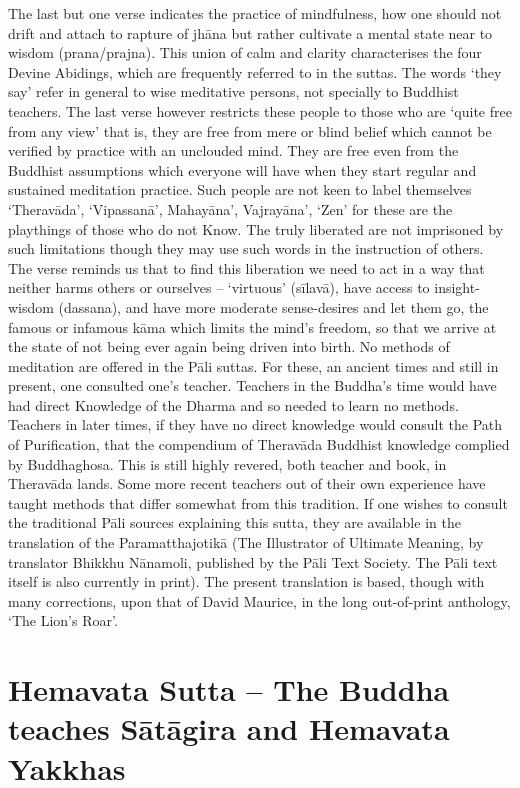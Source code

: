    The last but one verse indicates the practice of mindfulness, how one should not drift and attach to rapture of jh\=ana but rather cultivate a mental state near to wisdom (prana/prajna). This union of calm and clarity characterises the four Devine Abidings, which are frequently referred to in the suttas. The words `they say' refer in general to wise meditative persons, not specially to Buddhist teachers.
   The last verse however restricts these people to those who are `quite free from any view' that is, they are free from mere or blind belief which cannot be verified by practice with an unclouded mind. They are free even from the Buddhist assumptions which everyone will have when they start regular and sustained meditation practice. Such people are not keen to label themselves `Therav\=ada', `Vipassan\=a', Mahay\=ana', Vajray\=ana', `Zen' for these are the playthings of those who do not Know. The truly liberated are not imprisoned by such limitations though they may use such words in the instruction of others. The verse reminds us that to find this liberation we need to act in a way that neither harms others or ourselves – `virtuous' (sīlav\=a), have access to insight-wisdom (dassana), and have more moderate sense-desires and let them go, the famous or infamous k\=ama which limits the mind's freedom, so that we arrive at the state of not being ever again being driven into birth.
   No methods of meditation are offered in the P\=ali suttas. For these, an ancient times and still in present, one consulted one's teacher. Teachers in the Buddha's time would have had direct Knowledge of the Dharma and so needed to learn no methods. Teachers in later times,  if they have no direct knowledge would consult the Path of Purification, that the compendium of Therav\=ada Buddhist knowledge complied by Buddhaghosa. This is still highly revered, both teacher and book, in Therav\=ada lands. Some more recent teachers out of their own experience have taught methods that differ somewhat from this tradition.
   If one wishes to consult the traditional P\=ali sources explaining this sutta, they are available  in the translation of the Paramatthajotik\=a (The Illustrator of Ultimate Meaning, by translator Bhikkhu N\=anamoli, published by the P\=ali Text Society. The P\=ali text itself is also currently in print).
   The present translation is based, though with many corrections, upon that of David Maurice, in the long out-of-print anthology, `The Lion's Roar'.
   
   
   \chapter{Hemavata Sutta -- The Buddha teaches S\=at\=agira and Hemavata Yakkhas}
   
